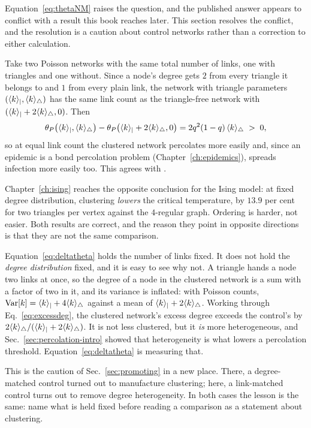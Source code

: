 Equation~\eqref{eq:thetaNM} raises the question, and the published answer
appears to conflict with a result this book reaches later. This section
resolves the conflict, and the resolution is a caution about control networks
rather than a correction to either calculation.

Take two Poisson networks with the same total number of links, one with
triangles and one without. Since a node's degree gets $2$ from every triangle it
belongs to and $1$ from every plain link, the network with triangle parameters
$(\langle k \rangle_{|},\langle k \rangle_{\triangle})$ has the same link count as the
triangle-free network with $(\langle k \rangle_{|}+2\langle k \rangle_{\triangle},0)$. Then
\begin{equation}
  \theta_{P}\bigl(\langle k \rangle_{|},\langle k \rangle_{\triangle}\bigr)
  -\theta_{P}\bigl(\langle k \rangle_{|}+2\langle k \rangle_{\triangle},0\bigr)
  =2q^{2}(1-q)\,\langle k \rangle_{\triangle}\;>\;0,
  \label{eq:deltatheta}
\end{equation}
so at equal link count the clustered network percolates more easily and, since
an epidemic is a bond percolation problem (Chapter~\ref{ch:epidemics}), spreads
infection more easily too. This agrees with \citet{newman2003}.

Chapter~\ref{ch:ising} reaches the opposite conclusion for the Ising model: at
fixed degree distribution, clustering \emph{lowers} the critical temperature, by
$13.9$ per cent for two triangles per vertex against the $4$-regular graph.
Ordering is harder, not easier. Both results are correct, and the reason they
point in opposite directions is that they are not the same comparison.

Equation~\eqref{eq:deltatheta} holds the number of links fixed. It does not hold
the \emph{degree distribution} fixed, and it is easy to see why not. A triangle
hands a node two links at once, so the degree of a node in the clustered network
is a sum with a factor of two in it, and its variance is inflated: with Poisson
counts, $\mathrm{Var}[k]=\langle k \rangle_{|}+4\langle k \rangle_{\triangle}$ against a mean of
$\langle k \rangle_{|}+2\langle k \rangle_{\triangle}$. Working through Eq.~\eqref{eq:excessdeg},
the clustered network's excess degree exceeds the control's by
$2\langle k \rangle_{\triangle}/(\langle k \rangle_{|}+2\langle k \rangle_{\triangle})$. It is not less
clustered, but it \emph{is} more heterogeneous, and
Sec.~\ref{sec:percolation-intro} showed that heterogeneity is what lowers a
percolation threshold. Equation~\eqref{eq:deltatheta} is measuring that.

This is the caution of Sec.~\ref{sec:promoting} in a new place. There, a
degree-matched control turned out to manufacture clustering; here, a
link-matched control turns out to remove degree heterogeneity. In both cases the
lesson is the same: name what is held fixed before reading a comparison as a
statement about clustering.

